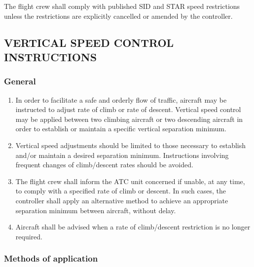 \documentclass[../main.tex]{subfiles}
\begin{document}
    The flight crew shall comply with published SID and STAR speed restrictions unless the restrictions are explicitly cancelled or amended by the controller.



    \subsection[Vertical speed control instructions]{VERTICAL SPEED CONTROL INSTRUCTIONS}

    \subsubsection{General}

    \begin{enumerate}
        \item In order to facilitate a safe and orderly flow of traffic, aircraft may be instructed to adjust rate of climb or rate of descent. Vertical speed control may be applied between two climbing aircraft or two descending aircraft in order to establish or maintain a specific vertical separation minimum.
        \item Vertical speed adjustments should be limited to those necessary to establish and/or maintain a desired separation minimum. Instructions involving frequent changes of climb/descent rates should be avoided.
        \item The flight crew shall inform the ATC unit concerned if unable, at any time, to comply with a specified rate of climb or descent. In such cases, the controller shall apply an alternative method to achieve an appropriate separation minimum between aircraft, without delay.
        \item Aircraft shall be advised when a rate of climb/descent restriction is no longer required.
    \end{enumerate}

    \subsubsection{Methods of application}
\end{document}
